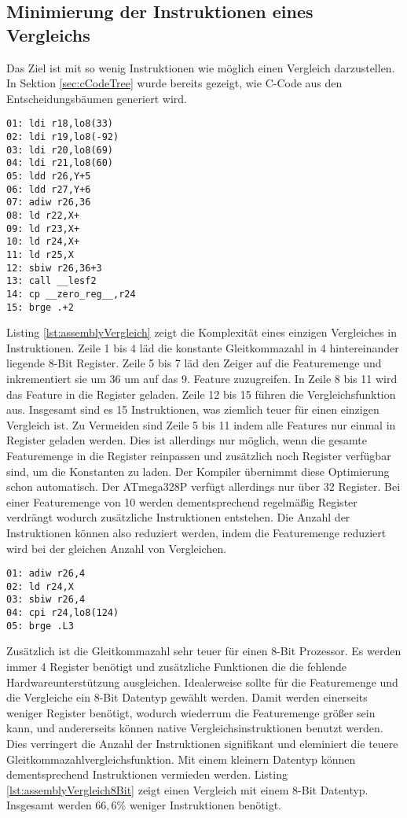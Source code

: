 \subsection{Minimierung der Instruktionen eines Vergleichs}
Das Ziel ist mit so wenig Instruktionen wie möglich einen Vergleich darzustellen. In Sektion \ref{sec:cCodeTree} wurde
bereits gezeigt, wie C-Code aus den Entscheidungsbäumen generiert wird.
\begin{lstlisting}[label=lst:assemblyVergleich,caption={Vergleich von Gleitkommazahl-Feature mit konstanter Gleitkommazahl.}]
01: ldi r18,lo8(33)
02: ldi r19,lo8(-92)
03: ldi r20,lo8(69)
04: ldi r21,lo8(60)
05: ldd r26,Y+5
06: ldd r27,Y+6
07: adiw r26,36
08: ld r22,X+
09: ld r23,X+
10: ld r24,X+
11: ld r25,X
12: sbiw r26,36+3
13: call __lesf2
14: cp __zero_reg__,r24
15: brge .+2
\end{lstlisting}
Listing \ref{lst:assemblyVergleich} zeigt die Komplexität eines einzigen Vergleiches in Instruktionen. Zeile 1 bis 4 läd die konstante Gleitkommazahl in 4 hintereinander liegende 8-Bit Register. Zeile 5
bis 7 läd den Zeiger auf die Featuremenge und inkrementiert sie um 36 um auf das 9. Feature zuzugreifen. In Zeile 8 bis 11 wird das Feature in die Register geladen. Zeile 12 bis 15 führen die
Vergleichsfunktion aus. Insgesamt sind es 15 Instruktionen, was ziemlich teuer für einen einzigen Vergleich ist.
\newline
\newline
Zu Vermeiden sind Zeile 5 bis 11 indem alle Features nur einmal in Register geladen werden. Dies ist allerdings nur möglich, wenn die gesamte Featuremenge in die Register reinpassen und zusätzlich
noch Register verfügbar sind, um die Konstanten zu laden. Der Kompiler übernimmt diese Optimierung schon automatisch. Der ATmega328P verfügt allerdings nur über 32 Register.
Bei einer Featuremenge von 10 werden dementsprechend regelmäßig Register verdrängt wodurch zusätzliche Instruktionen entstehen. Die Anzahl der Instruktionen können also reduziert werden, indem
die Featuremenge reduziert wird bei der gleichen Anzahl von Vergleichen.
\begin{lstlisting}[label=lst:assemblyVergleich8Bit,caption={Vergleich von 8-Bit-Feature mit konstanter 8-Bit Zahl.}]
01: adiw r26,4
02: ld r24,X
03: sbiw r26,4
04: cpi r24,lo8(124)
05: brge .L3
\end{lstlisting}
Zusätzlich ist die Gleitkommazahl sehr teuer für einen 8-Bit Prozessor. Es werden immer 4 Register benötigt und zusätzliche Funktionen die die fehlende Hardwareunterstützung ausgleichen. Idealerweise sollte
für die Featuremenge und die Vergleiche ein 8-Bit Datentyp gewählt werden. Damit werden einerseits weniger Register benötigt, wodurch wiederrum die Featuremenge größer sein kann, und andererseits können
native Vergleichsinstruktionen benutzt werden. Dies verringert die Anzahl der Instruktionen signifikant und eleminiert die teuere Gleitkommazahlvergleichsfunktion. Mit einem kleinern Datentyp können
dementsprechend Instruktionen vermieden werden. Listing \ref{lst:assemblyVergleich8Bit} zeigt einen Vergleich mit einem 8-Bit Datentyp. Insgesamt werden $66,6\%$ weniger Instruktionen benötigt.

